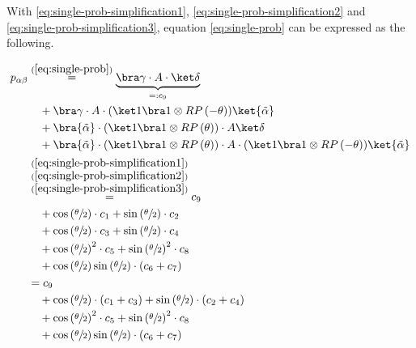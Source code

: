 With \ref{eq:single-prob-simplification1},
\ref{eq:single-prob-simplification2} and \ref{eq:single-prob-simplification3},
equation \ref{eq:single-prob} can be expressed as the following.

\begin{equation}
    \label{eq:single-prob-simplified}
    \begin{split}
        p_{\alpha\beta}
            &\stackrel{(\ref{eq:single-prob})}= \underbrace{\bra\gamma \cdot A \cdot \ket\delta}_{=: c_9} \\
                &\quad + \bra\gamma \cdot A \cdot (\ket 1 \bra 1 \otimes RP\left(-\theta\right)) \ket{\tilde\alpha} \\
                &\quad + \bra{\tilde\alpha} \cdot (\ket 1 \bra 1 \otimes RP\left(\theta\right)) \cdot A \ket\delta \\
                &\quad + \bra{\tilde\alpha} \cdot (\ket 1 \bra 1 \otimes RP\left(\theta\right)) \cdot A \cdot (\ket 1 \bra 1 \otimes RP\left(-\theta\right)) \ket{\tilde\alpha} \\
            &\stackrel{\substack{(\ref{eq:single-prob-simplification1})\\(\ref{eq:single-prob-simplification2})\\(\ref{eq:single-prob-simplification3})}}=
                c_9 \\
                &\quad + \cos\left(\sfrac\theta2\right) \cdot c_1 + \sin\left(\sfrac\theta2\right) \cdot c_2 \\
                &\quad + \cos\left(\sfrac\theta2\right) \cdot c_3 + \sin\left(\sfrac\theta2\right) \cdot c_4 \\
                &\quad + \cos\left(\sfrac\theta2\right)^2 \cdot c_5 + \sin\left(\sfrac\theta2\right)^2 \cdot c_8 \\
                &\quad + \cos\left(\sfrac\theta2\right)\sin\left(\sfrac\theta2\right) \cdot \left(c_6 + c_7\right) \\
            &= c_9 \\
                &\quad + \cos\left(\sfrac\theta2\right) \cdot \left(c_1 + c_3\right) + \sin\left(\sfrac\theta2\right) \cdot \left(c_2 + c_4\right) \\
                &\quad + \cos\left(\sfrac\theta2\right)^2 \cdot c_5 + \sin\left(\sfrac\theta2\right)^2 \cdot c_8 \\
                &\quad + \cos\left(\sfrac\theta2\right)\sin\left(\sfrac\theta2\right) \cdot \left(c_6 + c_7\right) \\
    \end{split}
\end{equation}

